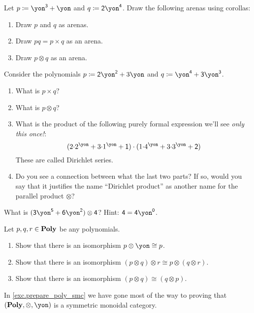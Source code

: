 \documentclass[DynamicalBook]{subfiles}
\begin{document}
\begin{exercise}
Let $p\coloneqq\yon^\3+\yon$ and $q\coloneqq\2\yon^\4$. Draw the following
arenas using corollas:
\begin{enumerate}
	\item Draw $p$ and $q$ as arenas.
	\item Draw $pq=p\times q$ as an arena.
	\item Draw $p\otimes q$ as an arena.
\qedhere
\end{enumerate}
\end{exercise}

\begin{exercise}
Consider the polynomials $p\coloneqq \2\yon^\2+3\yon$ and $q\coloneqq\yon^\4+\3\yon^\3$.
\begin{enumerate}
	\item What is $p\times q$?
	\item What is $p\otimes q$?
	\item What is the product of the following purely formal expression we'll see \emph{only this once!}:
	\[
	(2\mdot2^\yon+3\mdot 1^\yon+\1) \cdot 
	(1\mdot4^\yon+3\mdot 3^\yon+\2)
	\]
These are called Dirichlet series.
	\item Do you see a connection between what the last two parts? If so, would
    you say that it justifies the name ``Dirichlet product'' as another name for
    the parallel product $\otimes$?
\end{enumerate}
\end{exercise}

\begin{exercise}
What is $(\3\yon^\5+\6\yon^\2)\otimes\4$? Hint: $\4=\4\yon^\0$.
\end{exercise}

\begin{exercise}\label{exc.prepare_poly_smc}
Let $p,q,r\in\textbf{Poly}$ be any polynomials.
\begin{enumerate}
  \item Show that there is an isomorphism $p\otimes\yon\cong p$.
  \item Show that there is an isomorphism $(p\otimes q)\otimes r\cong p\otimes (q\otimes r)$.
  \item Show that there is an isomorphism $(p\otimes q)\cong(q\otimes p)$.
 \qedhere
\end{enumerate}
\end{exercise}

In \cref{exc.prepare_poly_smc} we have gone most of the way to proving that $(\poly,\otimes,\yon)$ is a symmetric monoidal category. 
\end{document}
